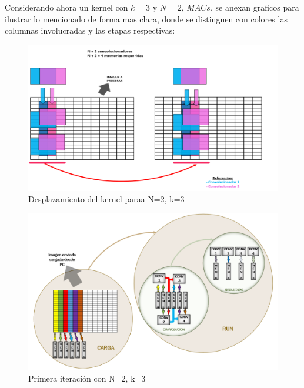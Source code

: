 Considerando ahora un kernel con $k=3$ y  $N=2$, $MACs$, se anexan graficos para ilustrar lo mencionado de forma mas clara, 
donde se distinguen con colores las columnas involucradas y las etapas respectivas:

\begin{figure}
\centering
\includegraphics[scale=0.75]{conv2_despl.png}
\caption{Desplazamiento del kernel paraa N=2, k=3 }
\label{writingprocess2}
\end{figure}

\begin{figure}
\centering
\includegraphics[scale=0.7]{example_1}
\caption{Primera iteración con N=2, k=3 }
\label{writingprocess3}
\end{figure}


